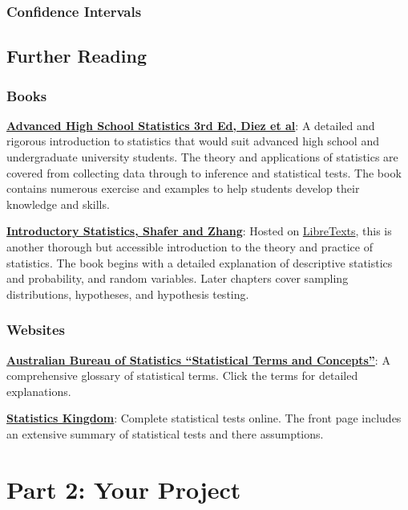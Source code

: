\documentclass[
]{book}
\begin{document}
\section{Confidence Intervals}\label{confidence-intervals}

\chapter{Further Reading}\label{further_reading}

\section{Books}\label{books}

\href{https://www.openintro.org/book/ahss/}{\textbf{Advanced High School Statistics 3rd Ed, Diez et al}}: A detailed and rigorous introduction to statistics that would suit advanced high school and undergraduate university students. The theory and applications of statistics are covered from collecting data through to inference and statistical tests. The book contains numerous exercise and examples to help students develop their knowledge and skills.

\href{https://stats.libretexts.org/Bookshelves/Introductory_Statistics/Introductory_Statistics_(Shafer_and_Zhang)}{\textbf{Introductory Statistics, Shafer and Zhang}}: Hosted on \href{https://libretexts.org/}{LibreTexts}, this is another thorough but accessible introduction to the theory and practice of statistics. The book begins with a detailed explanation of descriptive statistics and probability, and random variables. Later chapters cover sampling distributions, hypotheses, and hypothesis testing.

\section{Websites}\label{websites}

\href{https://www.abs.gov.au/statistics/understanding-statistics/statistical-terms-and-concepts}{\textbf{Australian Bureau of Statistics ``Statistical Terms and Concepts''}}: A comprehensive glossary of statistical terms. Click the terms for detailed explanations.

\href{https://www.statskingdom.com/index.html}{\textbf{Statistics Kingdom}}: Complete statistical tests online. The front page includes an extensive summary of statistical tests and there assumptions.

\part*{Part 2: Your Project}\label{part-part-2-your-project}
\end{document}
